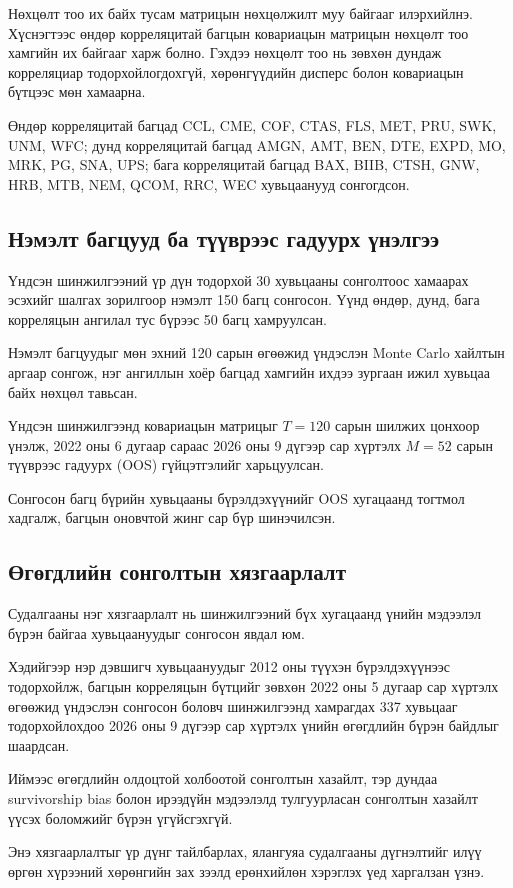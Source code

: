 Нөхцөлт тоо их байх тусам матрицын
нөхцөлжилт муу байгааг илэрхийлнэ.
Хүснэгтээс өндөр корреляцитай багцын
ковариацын матрицын нөхцөлт тоо хамгийн
их байгааг харж болно. Гэхдээ нөхцөлт
тоо нь зөвхөн дундаж корреляциар
тодорхойлогдохгүй, хөрөнгүүдийн дисперс
болон ковариацын бүтцээс мөн хамаарна.

Өндөр корреляцитай багцад CCL, CME, COF,
CTAS, FLS, MET, PRU, SWK, UNM, WFC;
дунд корреляцитай багцад AMGN, AMT, BEN,
DTE, EXPD, MO, MRK, PG, SNA, UPS;
бага корреляцитай багцад BAX, BIIB, CTSH,
GNW, HRB, MTB, NEM, QCOM, RRC, WEC
хувьцаанууд сонгогдсон.

\subsection{Нэмэлт багцууд ба түүврээс гадуурх үнэлгээ}

Үндсэн шинжилгээний үр дүн тодорхой
30 хувьцааны сонголтоос хамаарах эсэхийг
шалгах зорилгоор нэмэлт 150 багц сонгосон.
Үүнд өндөр, дунд, бага корреляцын ангилал
тус бүрээс 50 багц хамруулсан.

Нэмэлт багцуудыг мөн эхний 120 сарын
өгөөжид үндэслэн Monte Carlo хайлтын
аргаар сонгож, нэг ангиллын хоёр багцад
хамгийн ихдээ зургаан ижил хувьцаа
байх нөхцөл тавьсан.

Үндсэн шинжилгээнд ковариацын матрицыг
$T=120$ сарын шилжих цонхоор үнэлж,
2022 оны 6 дугаар сараас 2026 оны
9 дүгээр сар хүртэлх $M=52$ сарын
түүврээс гадуурх (OOS) гүйцэтгэлийг
харьцуулсан.

Сонгосон багц бүрийн хувьцааны
бүрэлдэхүүнийг OOS хугацаанд тогтмол
хадгалж, багцын оновчтой жинг сар бүр
шинэчилсэн.

\subsection{Өгөгдлийн сонголтын хязгаарлалт}

Судалгааны нэг хязгаарлалт нь шинжилгээний
бүх хугацаанд үнийн мэдээлэл бүрэн байгаа
хувьцаануудыг сонгосон явдал юм.

Хэдийгээр нэр дэвшигч хувьцаануудыг
2012 оны түүхэн бүрэлдэхүүнээс тодорхойлж,
багцын корреляцын бүтцийг зөвхөн
2022 оны 5 дугаар сар хүртэлх өгөөжид
үндэслэн сонгосон боловч шинжилгээнд
хамрагдах 337 хувьцааг тодорхойлохдоо
2026 оны 9 дүгээр сар хүртэлх үнийн
өгөгдлийн бүрэн байдлыг шаардсан.

Иймээс өгөгдлийн олдоцтой холбоотой
сонголтын хазайлт, тэр дундаа
survivorship bias болон ирээдүйн
мэдээлэлд тулгуурласан сонголтын
хазайлт үүсэх боломжийг бүрэн
үгүйсгэхгүй.

Энэ хязгаарлалтыг үр дүнг тайлбарлах,
ялангуяа судалгааны дүгнэлтийг илүү
өргөн хүрээний хөрөнгийн зах зээлд
ерөнхийлөн хэрэглэх үед харгалзан үзнэ.
